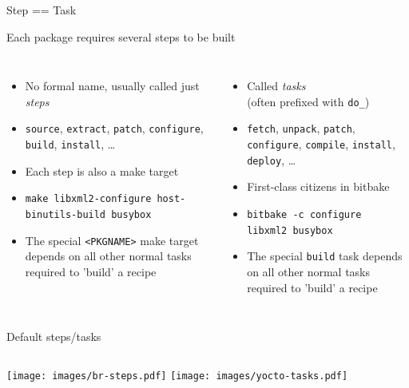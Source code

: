 \documentclass[xetex,table,aspectratio=43]{beamer}
\begin{document}
\begin{frame}{Step == Task}
  \begin{center}
    Each package requires several steps to be built
  \end{center}

  \footnotesize
  \begin{columns}
    \begin{itemize}
    \item No formal name, usually called just {\em steps}
    \item {\tt source}, {\tt extract}, {\tt patch}, {\tt configure},
      {\tt build}, {\tt install}, \dots
    \item Each step is also a make target
    \item {\tt make libxml2-configure host-binutils-build busybox}
    \item The special {\tt <PKGNAME>} make target depends on all other normal
      tasks required to 'build' a recipe
    \end{itemize}

    \begin{itemize}
    \item Called {\em tasks}\\
      (often prefixed with {\tt do\_})
    \item {\tt fetch}, {\tt unpack}, {\tt patch}, {\tt configure},
      {\tt compile}, {\tt install}, {\tt deploy}, \dots
    \item First-class citizens in bitbake
    \item {\tt bitbake -c configure\\
      libxml2 busybox}
    \item The special {\tt build} task depends on all other normal
      tasks required to 'build' a recipe
    \end{itemize}
  \end{columns}
\end{frame}

\begin{frame}{Default steps/tasks}
  \begin{columns}
    \center\texttt{[image: images/br-steps.pdf]}
    \center\texttt{[image: images/yocto-tasks.pdf]}
  \end{columns}
\end{frame}
\end{document}
